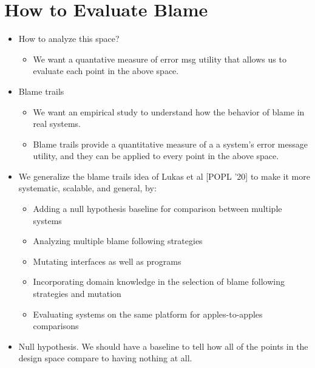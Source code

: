 \section{How to Evaluate Blame}

\begin{itemize}

    \item How to analyze this space?
          \begin{itemize}
            \item We want a quantative measure of error msg utility that allows
                  us to evaluate each point in the above space.
          \end{itemize}       

     \item Blame trails
       \begin{itemize}
       
        \item We want an empirical study to understand how the behavior of blame
        in real systems.

       
        \item Blame trails provide a quantitative measure of a a system's
        error message utility, and they can be applied to every point
        in the above space.
       \end{itemize}       

       \item We generalize the blame trails idea of Lukas et al [POPL '20] to make it
        more systematic, scalable, and general, by:
           \begin{itemize}
             \item Adding a null hypothesis baseline for comparison between multiple systems
             \item Analyzing multiple blame following strategies
             \item Mutating interfaces as well as programs
             \item Incorporating domain knowledge in the selection of blame following
           strategies and mutation
             \item Evaluating systems on the same platform for apples-to-apples comparisons
           \end{itemize}   

         \item Null hypothesis. We should have a baseline to tell how all of the points in the
        design space compare to having nothing at all.
\end{itemize}
